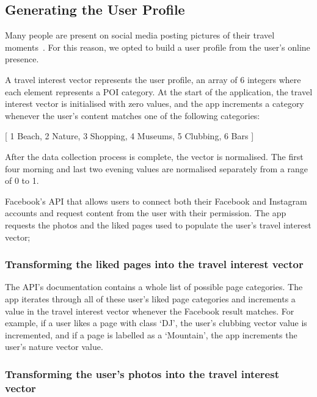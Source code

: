 
\subsection{Generating the User Profile}

Many people are present on social media posting
pictures of their travel moments~\cite{Miller2016}. For this reason, we opted to
build a user profile from the user's online presence.

A travel interest vector represents the user profile,
an array of 6 integers where each element represents a
POI category. At the start of the application, the
travel interest vector is initialised with zero
values, and the app increments a category whenever the
user's content matches one of the following categories:

\begin{center}
    [   
    1 Beach,
    2 Nature,
    3 Shopping,
    4 Museums,
    5 Clubbing,
    6 Bars ]
    
\end{center}

After the data collection process is complete, the
vector is normalised. The first four morning and last
two evening values are normalised separately from a
range of 0 to 1.

Facebook's API that allows users to connect both their Facebook
and Instagram accounts and request content from the user with their permission.
The app requests the photos and the liked pages used to 
populate the user's travel interest
vector; 
\pagebreak

\subsubsection{Transforming the liked pages into the travel interest vector}

The API's documentation contains a whole list of possible
page categories. 
The app iterates through all of these user's liked
page categories and increments a value in the travel
interest vector whenever the Facebook result matches.
For example, if a user likes a page with class `DJ',
the user's clubbing vector value is incremented, and if a page is labelled as a
`Mountain', the app increments the user's nature vector value.

\subsubsection{Transforming the user's photos into the travel interest vector}


